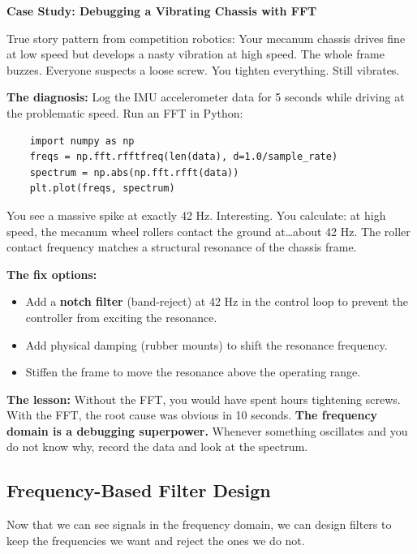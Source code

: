 \vspace{0.5em}
\begin{mdframed}[linewidth=1pt, innertopmargin=10pt, innerbottommargin=10pt]
\textbf{Case Study: Debugging a Vibrating Chassis with FFT}

\vspace{0.3em}
True story pattern from competition robotics: Your mecanum chassis drives fine at low speed but develops a nasty vibration at high speed. The whole frame buzzes. Everyone suspects a loose screw. You tighten everything. Still vibrates.

\textbf{The diagnosis:} Log the IMU accelerometer data for 5 seconds while driving at the problematic speed. Run an FFT in Python:

\begin{verbatim}
    import numpy as np
    freqs = np.fft.rfftfreq(len(data), d=1.0/sample_rate)
    spectrum = np.abs(np.fft.rfft(data))
    plt.plot(freqs, spectrum)
\end{verbatim}

You see a massive spike at exactly 42 Hz. Interesting. You calculate: at high speed, the mecanum wheel rollers contact the ground at\ldots about 42 Hz. The roller contact frequency matches a structural resonance of the chassis frame.

\textbf{The fix options:}
\begin{itemize}[nosep]
    \item Add a \textbf{notch filter} (band-reject) at 42 Hz in the control loop to prevent the controller from exciting the resonance.
    \item Add physical damping (rubber mounts) to shift the resonance frequency.
    \item Stiffen the frame to move the resonance above the operating range.
\end{itemize}

\textbf{The lesson:} Without the FFT, you would have spent hours tightening screws. With the FFT, the root cause was obvious in 10 seconds. \textbf{The frequency domain is a debugging superpower.} Whenever something oscillates and you do not know why, record the data and look at the spectrum.
\end{mdframed}

\subsection{Frequency-Based Filter Design}

Now that we can see signals in the frequency domain, we can design filters to keep the frequencies we want and reject the ones we do not.

